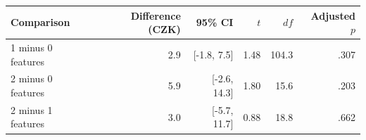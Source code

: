 \begin{tabular}{lrrrrr}
\toprule
Comparison & Difference (CZK) & 95\% CI & $t$ & $df$ & Adjusted $p$ \\
\midrule
1 minus 0 features & 2.9 & [-1.8, 7.5] & 1.48 & 104.3 & .307 \\
2 minus 0 features & 5.9 & [-2.6, 14.3] & 1.80 & 15.6 & .203 \\
2 minus 1 features & 3.0 & [-5.7, 11.7] & 0.88 & 18.8 & .662 \\
\bottomrule
\end{tabular}
